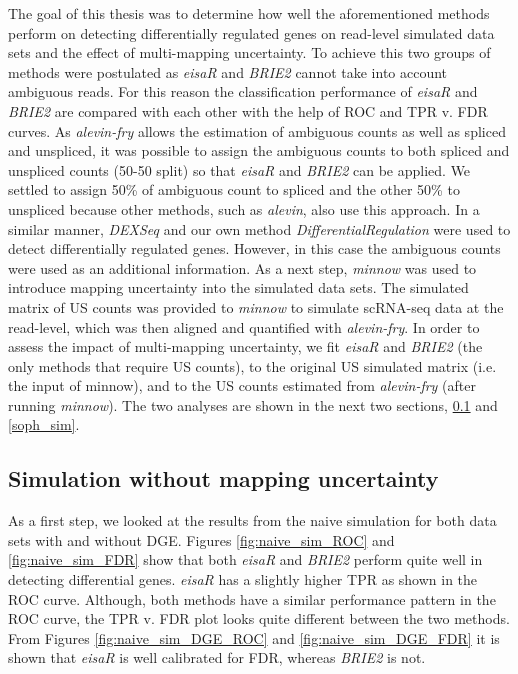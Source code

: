 The goal of this thesis was to determine how well the aforementioned methods perform on detecting differentially regulated genes on read-level simulated data sets and the effect  of multi-mapping uncertainty. To achieve this two groups of methods were postulated as \emph{eisaR} and \emph{BRIE2} cannot take into account ambiguous reads. For this reason the classification performance of \emph{eisaR} and \emph{BRIE2} are compared with each other with the help of ROC and TPR v. FDR curves. As \emph{alevin-fry} allows the estimation of ambiguous counts as well as spliced and unspliced, it was possible to assign the ambiguous counts to both spliced and unspliced counts (50-50 split) so that \emph{eisaR} and \emph{BRIE2} can be applied. We settled to assign 50\% of ambiguous count to spliced and the other 50\% to unspliced because other methods, such as \emph{alevin}, also use this approach. In a similar manner, \emph{DEXSeq} and our own method \emph{DifferentialRegulation} were used to detect differentially regulated genes. However, in this case the ambiguous counts were used as an additional information. As a next step, \emph{minnow} was used to introduce mapping uncertainty into the simulated data sets. The simulated matrix of US counts was provided to \emph{minnow} to simulate scRNA-seq data at the read-level, which was then aligned and quantified with \emph{alevin-fry}. In order to assess the impact of multi-mapping uncertainty, we fit \emph{eisaR} and \emph{BRIE2} (the only methods that require US counts), to the original US simulated matrix (i.e. the input of minnow), and to the US counts estimated from \emph{alevin-fry} (after running \emph{minnow}). The two analyses are shown in the next two sections, \ref{naive_sim} and \ref{soph_sim}.

\subsection{Simulation without mapping uncertainty} \label{naive_sim}
As a first step, we looked at the results from the naive simulation for both data sets with and without DGE. Figures \ref{fig:naive_sim_ROC} and \ref{fig:naive_sim_FDR} show that both \emph{eisaR} and \emph{BRIE2} perform quite well in detecting differential genes. \emph{eisaR} has a slightly higher TPR as shown in the ROC curve. Although, both methods have a similar performance pattern in the ROC curve, the TPR v. FDR plot looks quite different between the two methods. From Figures \ref{fig:naive_sim_DGE_ROC} and \ref{fig:naive_sim_DGE_FDR} it is shown that \emph{eisaR} is well calibrated for FDR, whereas \emph{BRIE2} is not.

